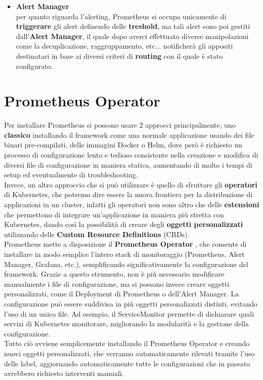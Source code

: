 \begin{itemize}
    \item \textbf{Alert Manager} \\
    per quanto riguarda l'alerting, Prometheus si occupa unicamente di \textbf{triggerare} gli alert definendo delle \textbf{treshold}, ma tali alert sono poi gestiti dall'\textbf{Alert Manager}, il quale dopo averci effettuato diverse manipolazioni come la decuplicazione, raggruppamento, etc... notificherà gli appositi destinatari in base ai diversi criteri di \textbf{routing} con il quale è stato configurato.
    
\end{itemize}

\section{Prometheus Operator} 
Per installare Prometheus si possono usare 2 approcci principalmente, uno \textbf{classico} installando il framework come una normale applicazione usando dei file binari pre-compilati, delle immagini Docker o Helm, dove però è richiesto un processo di configurazione lento e tedioso consistente nella creazione e modifica di diversi file di configurazione in maniera statica, aumentando di molto i tempi di setup ed eventualmente di troubleshooting. \\
Invece, un altro approccio che si può utilizzare è quello di sfruttare gli \textbf{operatori} di Kubernetes, che potremo dire essere la nuova frontiera per la distribuzione di applicazioni in un cluster, infatti gli operatori non sono altro che delle \textbf{estensioni} che permettono di integrare un'applicazione in maniera più stretta con Kubernetes, dando così la possibilità di creare degli \textbf{oggetti personalizzati} utilizzando delle \textbf{Custom Resource Definitions} (CRDs). 
\\
Prometheus mette a disposizione il \textbf{Prometheus Operator} \cite{Prometheus-operator}, che consente di installare in modo semplice l'intero stack di monitoraggio (Prometheus, Alert Manager, Grafana, etc.), semplificando significativamente la configurazione del framework. Grazie a questo strumento, non è più necessario modificare manualmente i file di configurazione, ma si possono invece creare oggetti personalizzati, come il Deployment di Prometheus o dell'Alert Manager. La configurazione può essere suddivisa in più oggetti personalizzati distinti, evitando l'uso di un unico file. Ad esempio, il ServiceMonitor permette di dichiarare quali servizi di Kubernetes monitorare, migliorando la modularità e la gestione della configurazione. \\
Tutto ciò avviene semplicemente installando il Prometheus Operator e creando nuovi oggetti personalizzati, che verranno automaticamente rilevati tramite l'uso delle label, aggiornando automaticamente tutte le configurazioni che in passato avrebbero richiesto interventi manuali.

